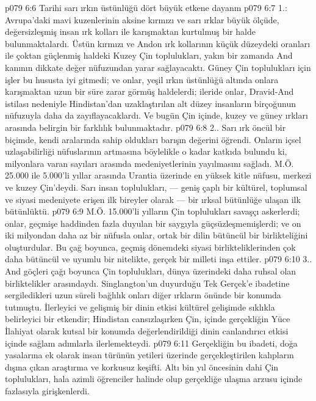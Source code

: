 \vs p079 6:6 Tarihi sarı ırkın üstünlüğü dört büyük etkene dayanm
\vs p079 6:7 1.\bibnobreakspace {}: Avrupa’daki mavi kuzenlerinin aksine kırmızı ve sarı ırklar büyük ölçüde, değersizleşmiş insan ırk kolları ile karışmaktan kurtulmuş bir halde bulunmaktalardı. Üstün kırmızı ve Andon ırk kollarının küçük düzeydeki oranları ile çoktan güçlenmiş haldeki Kuzey Çin toplulukları, yakın bir zamanda And kanının dikkate değer nüfuzundan yarar sağlayacaktı. Güney Çin toplulukları için işler bu hususta iyi gitmedi; ve onlar, yeşil ırkın üstünlüğü altında onlara karışmaktan uzun bir süre zarar görmüş haldelerdi; ileride onlar, Dravid\hyp{}And istilası nedeniyle Hindistan’dan uzaklaştırılan alt düzey insanların birçoğunun nüfuzuyla daha da zayıflayacaklardı. Ve bugün Çin içinde, kuzey ve güney ırkları arasında belirgin bir farklılık bulunmaktadır.
\vs p079 6:8 2.\bibnobreakspace {}. Sarı ırk öncül bir biçimde, kendi aralarında sahip oldukları barışın değerini öğrendi. Onların içsel uzlaşabilirliği nüfuslarının artmasına böylelikle o kadar katkıda bulundu ki, milyonlara varan sayıları arasında medeniyetlerinin yayılmasını sağladı. M.Ö. 25.000 ile 5.000’li yıllar arasında Urantia üzerinde en yüksek kitle nüfusu, merkezi ve kuzey Çin’deydi. Sarı insan toplulukları, --- geniş çaplı bir kültürel, toplumsal ve siyasi medeniyete erişen ilk bireyler olarak --- bir ırksal bütünlüğe ulaşan ilk bütünlüktü.
\vs p079 6:9 M.Ö. 15.000’li yılların Çin toplulukları savaşçı askerlerdi; onlar, geçmişe haddinden fazla duyulan bir saygıyla güçsüzleşmemişlerdi; ve on iki milyondan daha az bir nüfusla onlar, ortak bir dilin bütüncül bir birlikteliğini oluşturdular. Bu çağ boyunca, geçmiş dönemdeki siyasi birlikteliklerinden çok daha bütüncül ve uyumlu bir nitelikte, gerçek bir milleti inşa ettiler.
\vs p079 6:10 3.\bibnobreakspace {}. And göçleri çağı boyunca Çin toplulukları, dünya üzerindeki daha ruhsal olan birliktelikler arasındaydı. Singlangton’un duyurduğu Tek Gerçek’e ibadetine sergiledikleri uzun süreli bağlılık onları diğer ırkların önünde bir konumda tutmuştu. İlerleyici ve gelişmiş bir dinin etkisi kültürel gelişimde sıklıkla belirleyici bir etkendir; Hindistan cansızlaşırken Çin, içinde gerçekliğin Yüce İlahiyat olarak kutsal bir konumda değerlendirildiği dinin canlandırıcı etkisi içinde sağlam adımlarla ilerlemekteydi.
\vs p079 6:11 Gerçekliğin bu ibadeti, doğa yasalarına ek olarak insan türünün yetileri üzerinde gerçekleştirilen kalıpların dışına çıkan araştırma ve korkusuz keşifti. Altı bin yıl öncesinin dahi Çin toplulukları, hala azimli öğrenciler halinde olup gerçekliğe ulaşma arzusu içinde fazlasıyla girişkenlerdi.
